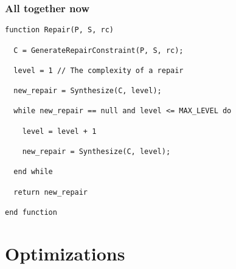 \documentclass{beamer}
\begin{document}
  
  \begin{frame}[fragile]
    \frametitle{All together now}
    \begin{lstlisting}
function Repair(P, S, rc)

  C = GenerateRepairConstraint(P, S, rc);

  level = 1 // The complexity of a repair

  new_repair = Synthesize(C, level);

  while new_repair == null and level <= MAX_LEVEL do

    level = level + 1

    new_repair = Synthesize(C, level);

  end while

  return new_repair

end function
\end{lstlisting}
\end{frame}
  
  \section*{Optimizations}
  \frame
  {
    \frametitle{}
  }
\end{document}
